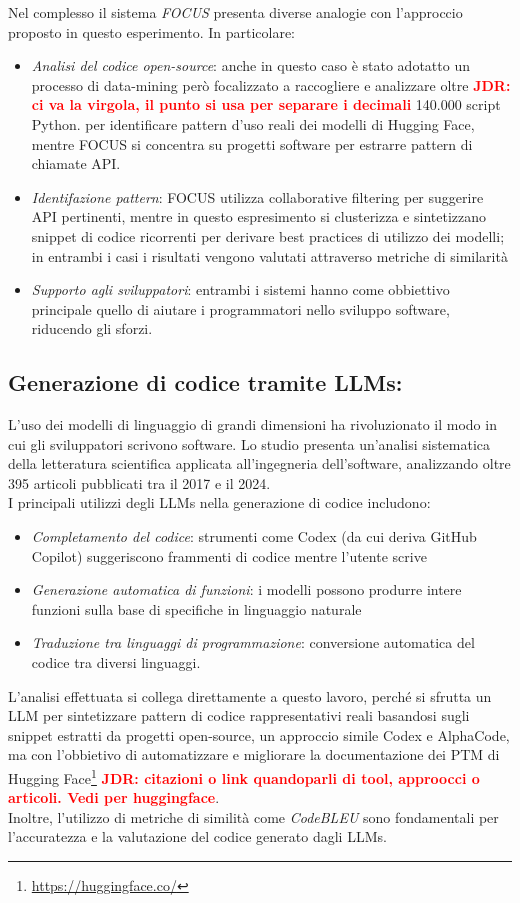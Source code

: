 \documentclass{article}
\newcommand{\JDR}[1]{\textbf{\textcolor{red}{JDR: {#1}}}}
\begin{document}
Nel complesso il sistema \textit{FOCUS} presenta diverse analogie con l'approccio proposto in questo esperimento. In particolare:
\begin{itemize}
    \item \textit{Analisi del codice open-source}: anche in questo caso è stato adotatto un processo di data-mining però focalizzato a raccogliere e analizzare oltre \JDR{ci va la virgola, il punto si usa per separare i decimali} 140.000 script Python. per identificare pattern d’uso reali dei modelli di Hugging Face, mentre FOCUS si concentra su progetti software per estrarre pattern di chiamate API.
    \item \textit{Identifazione pattern}: FOCUS utilizza collaborative filtering per suggerire API pertinenti, mentre in questo espresimento si clusterizza e sintetizzano snippet di codice ricorrenti per derivare best practices di utilizzo dei modelli; in entrambi i casi i risultati vengono valutati attraverso metriche di similarità
    \item \textit{Supporto agli sviluppatori}: entrambi i sistemi hanno come obbiettivo principale quello di aiutare i programmatori nello sviluppo software, riducendo gli sforzi.
\end{itemize}


\subsection{Generazione di codice tramite LLMs:}
L’uso dei modelli di linguaggio di grandi dimensioni ha rivoluzionato il modo in cui gli sviluppatori scrivono software. Lo studio\cite{hou2024large} presenta un'analisi sistematica della letteratura scientifica applicata all'ingegneria dell'software, analizzando oltre 395 articoli pubblicati tra il 2017 e il 2024.\\
I principali utilizzi degli LLMs nella generazione di codice includono:
\begin{itemize}
    \item \textit{Completamento del codice}: strumenti come Codex (da cui deriva GitHub Copilot) suggeriscono frammenti di codice mentre l’utente scrive
    \item \textit{Generazione automatica di funzioni}: i modelli possono produrre intere funzioni sulla base di specifiche in linguaggio naturale
    \item \textit{Traduzione tra linguaggi di programmazione}: conversione automatica del codice tra diversi linguaggi.
\end{itemize}
L'analisi effettuata si collega direttamente a questo lavoro, perché si sfrutta un LLM per sintetizzare pattern di codice rappresentativi reali basandosi sugli snippet estratti da progetti open-source, un approccio simile Codex e AlphaCode, ma con l'obbietivo di automatizzare e migliorare la documentazione dei PTM di Hugging Face\footnote{\url{https://huggingface.co/}} \JDR{citazioni o link quandoparli di tool, approocci o articoli. Vedi per huggingface}.\\
Inoltre, l'utilizzo di metriche di similità come \textit{CodeBLEU} sono fondamentali per l'accuratezza e la valutazione del codice generato dagli LLMs.
\end{document}
